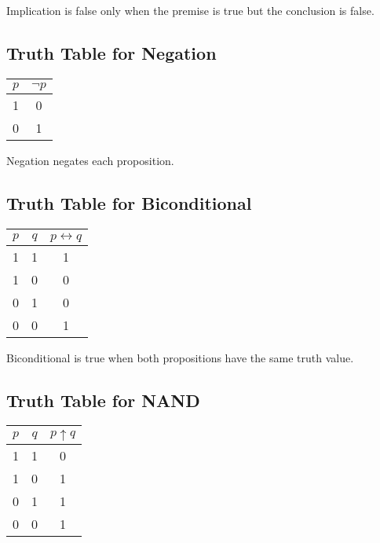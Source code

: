 \documentclass[12pt,a4paper,openany]{article}
\begin{document}
Implication is false only when the premise is true but the conclusion is false.

\subsection{Truth Table for Negation}\label{truth-table-for-negation}

\begin{center}
\begin{tabular}{|c|c|}
\hline
\(p\) & \(\neg p\) \\
\hline
1 & 0 \\
0 & 1 \\
\hline
\end{tabular}
\end{center}

Negation negates each proposition.

\subsection{Truth Table for Biconditional}\label{truth-table-for-biconditional}

\begin{center}
\begin{tabular}{|c|c|c|}
\hline
\(p\) & \(q\) & \(p \leftrightarrow q\) \\
\hline
1 & 1 & 1 \\
1 & 0 & 0 \\
0 & 1 & 0 \\
0 & 0 & 1 \\
\hline
\end{tabular}
\end{center}

Biconditional is true when both propositions have the same truth value.

\subsection{Truth Table for NAND}\label{truth-table-for-nand}

\begin{center}
\begin{tabular}{|c|c|c|}
\hline
\(p\) & \(q\) & \(p \uparrow q\) \\
\hline
1 & 1 & 0 \\
1 & 0 & 1 \\
0 & 1 & 1 \\
0 & 0 & 1 \\
\hline
\end{tabular}
\end{center}
\end{document}

